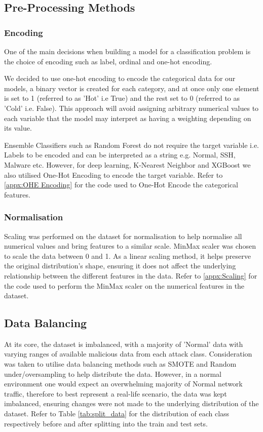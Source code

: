 \subsection{Pre-Processing Methods}

\subsubsection{Encoding}

One of the main decisions when building a model for a classification problem is the choice of encoding such as label, ordinal and one-hot encoding.

We decided to use one-hot encoding to encode the categorical data for our models, a binary vector is created for each category, and at once only one element is set to 1 (referred to as 'Hot' i.e True) and the rest set to 0 (referred to as 'Cold' i.e. False). This approach will avoid assigning arbitrary numerical values to each variable that the model may interpret as having a weighting depending on its value. 

Ensemble Classifiers such as Random Forest do not require the target variable i.e. Labels to be encoded and can be interpreted as a string e.g. Normal, SSH, Malware etc. However, for deep learning, K-Nearest Neighbor and XGBoost we also utilised One-Hot Encoding to encode the target variable. Refer to \ref{appx:OHE Encoding} for the code used to One-Hot Encode the categorical features. 


\subsubsection{Normalisation}

Scaling was performed on the dataset for normalisation to help normalise all numerical values and bring features to a similar scale. MinMax scaler was chosen to scale the data between 0 and 1. As a linear scaling method, it helps preserve the original distribution's shape, ensuring it does not affect the underlying relationship between the different features in the data. Refer to \ref{appx:Scaling} for the code used to perform the MinMax scaler on the numerical features in the dataset.

\subsection{Data Balancing}

At its core, the dataset is imbalanced, with a majority of 'Normal' data with varying ranges of available malicious data from each attack class. Consideration was taken to utilise data balancing methods such as SMOTE and Random under/oversampling to help distribute the data. However, in a normal environment one would expect an overwhelming majority of Normal network traffic, therefore to best represent a real-life scenario, the data was kept imbalanced, ensuring changes were not made to the underlying distribution of the dataset. Refer to Table \ref{tab:split_data} for the distribution of each class respectively before and after splitting into the train and test sets.

